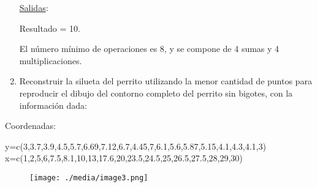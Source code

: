 \documentclass[12pt]{article}
\renewcommand{\_}{\kern-1.5pt\textunderscore\kern-1.5pt}
\begin{document}
\begin{enumerate}
\begin{justify}
\uline{Salidas}: 
\end{justify}\par

\begin{justify}
Resultado = 10. 
\end{justify}\par

\begin{justify}
El número mínimo de operaciones es 8, y se compone de 4 sumas y 4 multiplicaciones.
\end{justify}\par

	\item Reconstruir la silueta del perrito utilizando la menor cantidad de puntos para reproducir el dibujo del contorno completo del perrito sin bigotes, con la información dada:
\end{enumerate}\par

\begin{adjustwidth}{0.5in}{0.0in}
\begin{justify}
Coordenadas: 
\end{justify}\par

\end{adjustwidth}

\begin{adjustwidth}{0.5in}{0.0in}
\begin{justify}
y=c(3,3.7,3.9,4.5,5.7,6.69,7.12,6.7,4.45,7,6.1,5.6,5.87,5.15,4.1,4.3,4.1,3) x=c(1,2,5,6,7.5,8.1,10,13,17.6,20,23.5,24.5,25,26.5,27.5,28,29,30)
\end{justify}\par

\end{adjustwidth}




\begin{figure}[H]
	\begin{Center}
		\texttt{[image: ./media/image3.png]}
	\end{Center}
\end{figure}



\par
\end{document}
